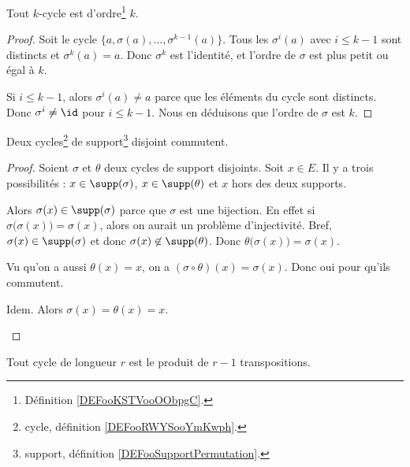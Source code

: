 \begin{lemma}		\label{LEMooGWZNooXFezrg}
	Tout \( k\)-cycle est d'ordre\footnote{Définition \ref{DEFooKSTVooOObpgC}.} \( k\).
\end{lemma}

\begin{proof}
	Soit le cycle \( \{ a,\sigma(a),\ldots, \sigma^{k-1}(a) \}\). Tous les \( \sigma^i(a)\) avec \( i\leq k-1\) sont distincts et \( \sigma^k(a)=a\). Donc \( \sigma^k\) est l'identité, et l'ordre de \( \sigma\) est plus petit ou égal à \( k\).

	Si \( i\leq k-1\), alors \( \sigma^i(a)\neq a\) parce que les éléments du cycle sont distincts. Donc \( \sigma^i\neq \id\) pour \( i\leq k-1\). Nous en déduisons que l'ordre de \( \sigma\) est \( k\).
\end{proof}

\begin{lemma}       \label{LEMooWXXLooIzrwJT}
	Deux cycles\footnote{cycle, définition \ref{DEFooRWYSooYmKwph}.} de support\footnote{support, définition \ref{DEFooSupportPermutation}.} disjoint commutent.
\end{lemma}

\begin{proof}
	Soient \( \sigma\) et \( \theta\) deux cycles de support disjoints. Soit \( x\in E\). Il y a trois possibilités : \( x\in \supp(\sigma)\), \( x\in \supp(\theta)\) et \( x\) hors des deux supports.
	\begin{subproof}
		Alors \( \sigma(x)\in \supp(\sigma)\) parce que \( \sigma\) est une bijection. En effet si \( \sigma\big( \sigma(x) \big)=\sigma(x)\), alors on aurait un problème d'injectivité. Bref, \( \sigma(x)\in\supp(\sigma)\) et donc \( \sigma(x)\not\in\supp(\theta)\). Donc \( \theta\big( \sigma(x) \big)=\sigma(x)\).

		Vu qu'on a aussi \( \theta(x)=x\), on a \( (\sigma\circ\theta)(x)=\sigma(x)\). Donc oui pour qu'ils commutent.

		Idem.
		Alors \( \sigma(x)=\theta(x)=x\).
	\end{subproof}
\end{proof}

\begin{lemma}     \label{LEMooVVPWooMkRjyR}
	Tout cycle de longueur \( r\) est le produit de \( r-1\) transpositions.
\end{lemma}

